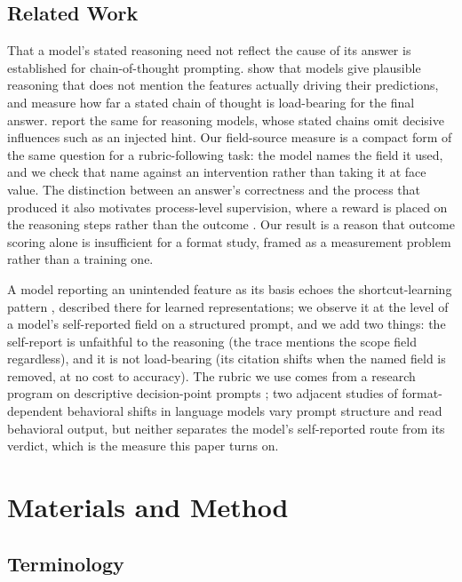 \documentclass[11pt,a4paper]{article}
\begin{document}
\subsection{Related Work}

That a model's stated reasoning need not reflect the cause of its answer is
established for chain-of-thought prompting. \citet{turpin2023} show that models
give plausible reasoning that does not mention the features actually driving their
predictions, and \citet{lanham2023} measure how far a stated chain of thought is
load-bearing for the final answer. \citet{chen2025reasoning} report the same for
reasoning models, whose stated chains omit decisive influences such as an injected
hint. Our field-source measure is a compact form of
the same question for a rubric-following task: the model names the field it used,
and we check that name against an intervention rather than taking it at face
value. The distinction between an answer's correctness and the process that
produced it also motivates process-level supervision, where a reward is placed on
the reasoning steps rather than the outcome \citep{lightman2023}. Our result is a
reason that outcome scoring alone is insufficient for a format study, framed as a
measurement problem rather than a training one.

A model reporting an unintended feature as its basis echoes the
shortcut-learning pattern \citep{geirhos2020}, described there for learned
representations; we observe it at the level of a model's self-reported field on a
structured prompt, and we add two things: the self-report is unfaithful to the
reasoning (the trace mentions the scope field regardless), and it is not
load-bearing (its citation shifts when the named field is removed, at no cost to
accuracy). The rubric we use comes from a research
program on descriptive decision-point prompts \citep{neilson2026capc}; two adjacent
studies of format-dependent behavioral shifts in language models
\citep{wang2026narrative, liu2026behavioral} vary prompt structure and read
behavioral output, but neither separates the model's self-reported route from its
verdict, which is the measure this paper turns on.

\section{Materials and Method}

\subsection{Terminology}\label{sec:terminology}
\end{document}
